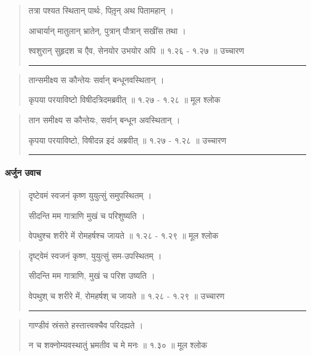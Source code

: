 \begin{quotation}

तत्रा पश्यत स्थितान् पार्थः, पितृ़न् अथ पितामहान्  ।  

आचार्यान् मातुलान् भ्रातेन्, पुत्रान् पौत्रान् सखींस तथा  । 

श्वशुरान् सुहृदश च एैव, सेनयोर उभयोर अपि  ॥ १.२६ - १.२७ ॥  उच्चारण

\noindent\rule{16cm}{0.4pt} 
\end{quotation}


\begin{quotation} 


तान्समीक्ष्य स कौन्तेयः सर्वान्‌ बन्धूनवस्थितान्‌  ।  
 
कृपया परयाविष्टो विषीदत्रिदमब्रवीत्‌  ॥ १.२७ - १.२८ ॥  मूल श्लोक
\end{quotation}

\begin{quotation}

तान समीक्ष्य स कौन्तेयः, सर्वान् बन्धून अवस्थितान्  ।  

कृपया परयाविष्टो, विषीदन्न इदं अब्रवीत्  ॥ १.२७ - १.२८ ॥  उच्चारण

\noindent\rule{16cm}{0.4pt} 
\end{quotation}

\paragraph{\sanskrit अर्जुन उवाच}

\begin{quotation} 


दृष्टेवमं स्वजनं कृष्ण युयुत्सुं समुपस्थितम्‌  ।  

सीदन्ति मम गात्राणि मुखं च परिशुष्यति  । 
 
वेपथुश्च शरीरे में रोमहर्षश्च जायते  ॥ १.२८ - १.२९ ॥  मूल श्लोक
\end{quotation}

\begin{quotation}

दृष्ट्वेमं स्वजनं कृष्ण, युयुत्सुं सम-उपस्थितम्  ।  

सीदन्ति मम गात्राणि, मुखं च परिश उष्यति  । 

वेपथुश् च शरीरे में, रोमहर्षश् च जायते  ॥ १.२८ - १.२९ ॥  उच्चारण

\noindent\rule{16cm}{0.4pt} 
\end{quotation}


\begin{quotation} 

गाण्डीवं स्रंसते हस्तात्त्वक्चैव परिदह्यते  ।  
 
न च शक्नोम्यवस्थातुं भ्रमतीव च मे मनः  ॥ १.३० ॥  मूल श्लोक
\end{quotation}

